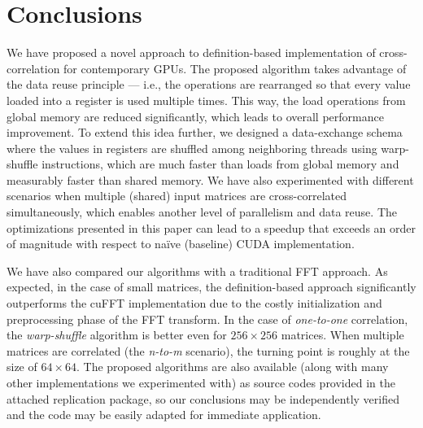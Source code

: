 










\section{Conclusions}\label{sec:crosscorr_conclusions}

We have proposed a novel approach to definition-based implementation of cross-correlation for contemporary GPUs. The proposed algorithm takes advantage of the data reuse principle --- i.e., the operations are rearranged so that every value loaded into a register is used multiple times. This way, the load operations from global memory are reduced significantly, which leads to overall performance improvement. To extend this idea further, we designed a data-exchange schema where the values in registers are shuffled among neighboring threads using warp-shuffle instructions, which are much faster than loads from global memory and measurably faster than shared memory. We have also experimented with different scenarios when multiple (shared) input matrices are cross-correlated simultaneously, which enables another level of parallelism and data reuse. The optimizations presented in this paper can lead to a speedup that exceeds an order of magnitude with respect to na\"{i}ve (baseline) CUDA implementation.

We have also compared our algorithms with a traditional FFT approach. As expected, in the case of small matrices, the definition-based approach significantly outperforms the cuFFT implementation due to the costly initialization and preprocessing phase of the FFT transform. In the case of \emph{one-to-one} correlation, the \emph{warp-shuffle} algorithm is better even for $256\times 256$ matrices. When multiple matrices are correlated (the \emph{n-to-m} scenario), the turning point is roughly at the size of $64\times 64$. The proposed algorithms are also available (along with many other implementations we experimented with) as source codes provided in the attached replication package, so our conclusions may be independently verified and the code may be easily adapted for immediate application.




